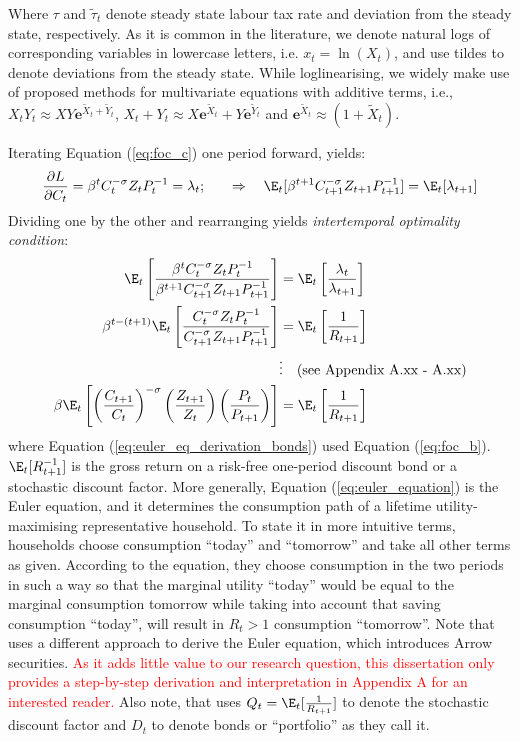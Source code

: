 Where $\tau$ and $\tilde{\tau}_t$ denote steady state labour tax rate and deviation from the steady state, respectively. As it is common in the literature, we denote natural logs of corresponding variables in lowercase letters, i.e. $x_t = \ln(X_t)$, and use tildes to denote deviations from the steady state. While loglinearising, we widely make use of \textcite{uhlig_1995_a} proposed methods for multivariate equations with additive terms, i.e., $X_tY_t \approx XY\mathbf{e}^{\tilde{X}_t + \tilde{Y}_t}$, $X_t + Y_t \approx X\mathbf{e}^{\tilde{X}_t} + Y\mathbf{e}^{\tilde{Y}_t}$ and $\mathbf{e}^{\tilde{X}_t} \approx (1 + \tilde{X}_t)$. 

Iterating Equation (\ref{eq:foc_c}) one period forward, yields:
\begin{align*}
    \frac{\partial L}{\partial C_t}     &= \beta^t C_t^{-\sigma}Z_t P_{t}^{-1} = \lambda_t; \quad &\Rightarrow \quad \E_t[\beta^{t+1} C_{t+1}^{-\sigma}Z_{t+1} P_{t+1}^{-1}] = \E_t[\lambda_{t+1}]
\end{align*}
Dividing one by the other and rearranging yields \textit{intertemporal optimality condition}:
\begin{align}
    \E_t\left[\frac{\beta^t C_t^{-\sigma}Z_t P_{t}^{-1}}{\beta^{t+1} C_{t+1}^{-\sigma}Z_{t+1} P_{t+1}^{-1}}\right]                 & = \E_t\left[\frac{\lambda_t}{\lambda_{t+1}}\right] \nonumber\\
    \beta^{t-(t+1)}\E_t\left[\frac{C_t^{-\sigma}Z_t P_{t}^{-1}}{C_{t+1}^{-\sigma}Z_{t+1} P_{t+1}^{-1}}\right]                 & = \E_t\left[\frac{1}{R_{t+1}}\right] \label{eq:euler_eq_derivation_bonds}\\
    &\vdots \quad \text{(see Appendix A.xx - A.xx)}\nonumber\\
    \beta\E_t\left[\left(\frac{C_{t+1}}{C_{t}}\right)^{-\sigma} \left(\frac{Z_{t+1}}{Z_t}\right) \left(\frac{P_{t}}{ P_{t+1}}\right)\right]                 &= \E_t \left[\frac{1}{R_{t+1}}\right] \label{eq:euler_equation}
\end{align}
where Equation (\ref{eq:euler_eq_derivation_bonds}) used Equation (\ref{eq:foc_b}). $\E_t [ R^{-1}_{t+1}]$ is the gross return on a risk-free one-period discount bond or a stochastic discount factor. More generally, Equation (\ref{eq:euler_equation}) is the Euler equation, and it determines the consumption path of a lifetime utility-maximising representative household. To state it in more intuitive terms, households choose consumption ``today'' and ``tomorrow'' and take all other terms as given. According to the equation, they choose consumption in the two periods in such a way so that the marginal utility ``today'' would be equal to the marginal consumption tomorrow while taking into account that saving consumption ``today'', will result in $R_t > 1$ consumption ``tomorrow''. Note that \textcite{jordigal_2015_monetary} uses a different approach to derive the Euler equation, which introduces Arrow securities. \textcolor{red}{As it adds little value to our research question, this dissertation only provides a step-by-step derivation and interpretation in Appendix A for an interested reader.} Also note, that \textcite{jordigal_2015_monetary} uses $Q_t = \E_t [ \frac{1}{R_{t+1}}]$ to denote the stochastic discount factor and $D_t$ to denote bonds or ``portfolio'' as they call it.

